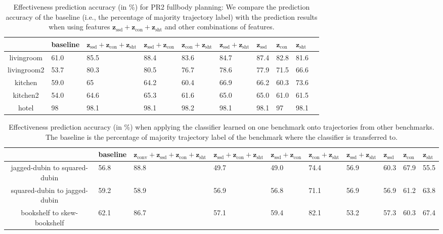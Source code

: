\documentclass[letterpaper, 10 pt, conference]{ieeeconf}  %
\newcommand{\fssd}{\mbox{$\mathbf z_{\text{ssd}}$}}
\newcommand{\fcon}{\mbox{$\mathbf z_{\text{con}}$}}
\newcommand{\fsht}{\mbox{$\mathbf z_{\text{sht}}$}}
\newcommand{\fconv}{\mbox{$\mathbf z_{\text{conv}}$}}
\begin{document}
\begin{table}[tbp]
\centering
\begin{tabular}{|c|R{0.9cm}|R{1.5cm}|R{1.3cm}|R{1.2cm}|R{1.2cm}|R{1.2cm}|R{0.9cm}|R{0.9cm}|R{0.9cm}|}
\hline 
 & baseline  & $\fssd+\fcon+\fsht$ & $\fssd+\fcon$ & $\fcon+\fsht$ & $\fssd+\fsht$ & $\fssd$ & $\fcon$ & $\fsht$ \\ \hline \hline
livingroom & 61.0 & 85.5	& 88.4 &	 83.6 &	84.7 &	87.4 & 	82.8 &	81.6 \\ \hline
livingroom2 & 53.7 & 80.3 &	 80.5	& 76.7 &	 78.6 &	77.9 & 	71.5 & 	66.6 \\ \hline
kitchen & 59.0 & 65 & 	64.2 & 	60.4 &	66.9 & 	66.2 & 	60.3 & 	73.6 \\ \hline
kitchen2 & 54.0 & 64.6 &	65.3 & 	61.6 & 	65.0 & 	65.0 & 	61.0 &	61.5 \\ \hline
hotel & 98 & 98.1 &	98.1 & 	98.2 &	98.1 &	98.1 &	97	& 98.1 \\ \hline
\end{tabular}
\caption{Effectiveness prediction accuracy (in \%) for PR2 fullbody planning: We compare the prediction accuracy of the baseline (i.e., the percentage of majority trajectory label) with the prediction results when using features $\fssd+\fcon+\fsht$ and other combinations of features.}
\label{tab:result}
\end{table}


\begin{table}[tbp]
\centering
\begin{tabular}{|c|R{0.9cm}|R{1.5cm}|R{1.3cm}|R{1.2cm}|R{1.2cm}|R{1.2cm}|R{0.7cm}|R{0.7cm}|R{0.7cm}|}
\hline 
 & baseline & $\fconv +\fssd+\fcon+\fsht$ & $\fssd+\fcon+\fsht$ & $\fssd+\fcon$ & $\fcon+\fsht$ & $\fssd+\fsht$ & $\fssd$ & $\fcon$ & $\fsht$ \\ \hline \hline
jagged-dubin to squared-dubin &  56.8 & 88.8 & 49.7 & 49.0 &	74.4 & 	56.9 & 	60.3	 & 67.9	& 55.5
 \\ \hline
squared-dubin to jagged-dubin & 59.2 & 58.9 & 56.9 &	56.8 &	71.1 & 	56.9 &	56.9 &	61.2 &	63.8 \\ \hline
bookshelf to skew-bookshelf & 62.1 & 86.7 & 57.1 &	59.4 &	82.1 & 	53.2 &	57.3 &	60.3 &	67.4 \\ \hline
\end{tabular}
\caption{Effectiveness prediction accuracy (in \%) when applying the classifier learned on one benchmark onto trajectories from other benchmarks. The baseline is the percentage of majority trajectory label of the benchmark where the classifier is transferred to.}
\label{tab:result2}
\end{table}
\end{document}
